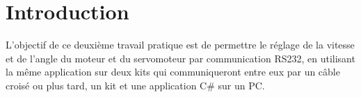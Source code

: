 \documentclass[12pt]{article}
\begin{document}
\pagestyle{fancy}
\chead {\today}
\fontsize{16}{16}\selectfont


\clearpage


\tableofcontents
\clearpage

\section{Introduction}
L'objectif de ce deuxième travail pratique est de permettre le réglage de la vitesse et de l'angle du moteur et du servomoteur par communication RS232, en utilisant la même application sur deux kits qui communiqueront entre eux par un câble croisé ou plus tard, un kit et une application C\# sur un PC.

\clearpage





\end{document}
